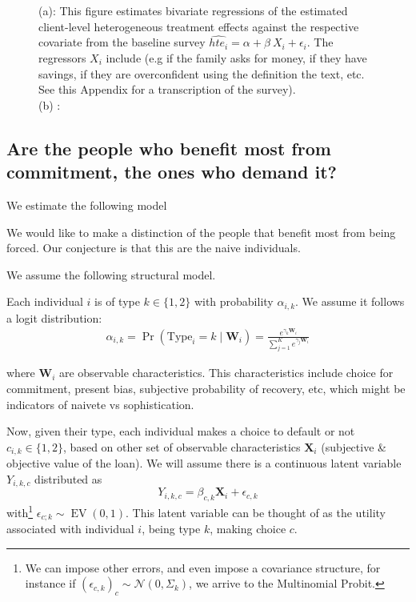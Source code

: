 \documentclass[oneside,11pt]{article}
\begin{document}
\begin{figure}[H]
\begin{center}
    \end{center}
     \scriptsize  (a): This figure estimates bivariate regressions of the estimated client-level heterogeneous treatment effects against the respective covariate from the baseline survey  $\widehat{hte_i} = \alpha + \beta \: X_i + \epsilon_i$. The regressors $X_i$ include (e.g if the family asks for money, if they have savings, if they are overconfident using the definition the text, etc. See this Appendix for a transcription of the survey). \\
     (b) :  
\end{figure}


\subsection{Are the people who benefit most from commitment, the ones who demand it?}

We estimate the following model

We would like to make a distinction of the people that benefit most from being forced. Our conjecture is that this are the naive individuals. 

We assume the following structural model. 


Each individual $i$ is of type  $k\in\{1, 2\}$ with probability $\alpha_{i,k}$. We assume it follows a logit distribution:
\begin{align*}
\label{dist_alpha}
    \alpha_{i,k} = \Pr(\text{Type}_i = k \;|\; \mathbf{W}_{i}) = \frac{e^{\gamma_{k}\mathbf{W}_i}}{\sum_{j=1}^{K} e^{\gamma_{j}\mathbf{W}_i}}
\end{align*}

where $\mathbf{W}_i$ are observable characteristics. This characteristics include choice for commitment, present bias, subjective probability of recovery, etc, which might be indicators of naivete vs sophistication.  

Now, given their type, each individual makes a choice to default or not $c_{i,k} \in \{1,2\}$, based on other set of observable characteristics $\mathbf{X}_i$ (subjective \& objective value of the loan). We will assume there is a continuous latent variable $Y_{i,k,c}$ distributed as
\[Y_{i,k,c} = \beta_{c,k}\mathbf{X}_{i} +\epsilon_{c,k}\]
with\footnote{We can impose other errors, and even impose a covariance structure, for instance if $(\epsilon_{c,k})_{c}\sim\mathcal{N}(0,\Sigma_k)$, we arrive to the Multinomial Probit.} $\epsilon_{c;k}\sim\operatorname{EV}(0,1)$. This latent variable can be thought of as the utility associated with individual $i$, being type $k$, making choice $c$. 
\end{document}
